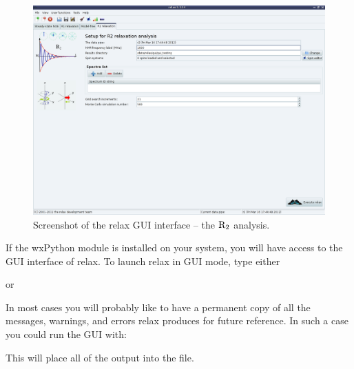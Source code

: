 \begin{figure}
\centerline{\includegraphics[width=\textwidth, bb=14 14 1065 768]{graphics/screenshots/analysis_r2}}
\caption[GUI screenshot -- $\Rtwo$ analysis]{Screenshot of the relax GUI interface -- the $\Rtwo$ analysis.}\label{fig: screenshot: R2 analysis}
\end{figure}

If the wxPython module is installed on your system, you will have access to the GUI interface of relax.  To launch relax in GUI mode, type either


or


In most cases you will probably like to have a permanent copy of all the messages, warnings, and errors relax produces for future reference.  In such a case you could run the GUI with:


This will place all of the output into the  file.

